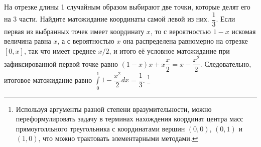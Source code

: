 \documentclass[a4paper,11pt]{article}
\begin{document}
%
%
%
%










На отрезке длины 1 случайным образом выбирают две точки, которые делят его на 3 части.
Найдите матожидание координаты самой левой из них.
$\dfrac{1}{3}$.
Если первая из выбранных точек имеет координату $x$, то с вероятностью $1-x$ искомая величина равна $x$, а с вероятностью $x$ она распределена равномерно на отрезке $[0,x]$, так что имеет среднее $x/2$, и итого её условное матожидание при зафиксированной первой точке равно $(1-x)x+x \dfrac{x}{2} = x - \dfrac{x^2}{2}$. Следовательно, итоговое матожидание равно $\int\limits_0^1 1 - \dfrac{x^2}{2} dx = \dfrac{1}{3}$. \footnote{Используя аргументы разной степени вразумительности, можно переформулировать задачу в терминах нахождения координат центра масс прямоуголльного треугольника с координатами вершин $(0,0)$, $(0,1)$ и $(1,0)$, что можно трактовать элементарными методами.}













\end{document}
